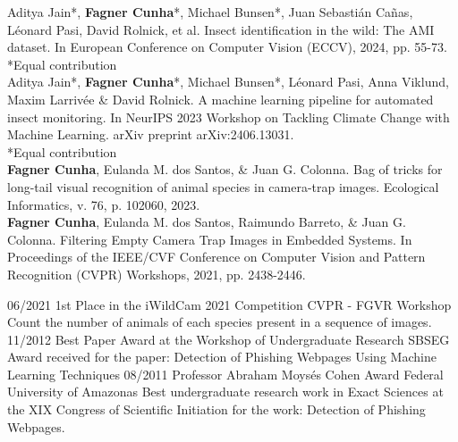 \documentclass[10pt]{developercv} %
\begin{document}
\begin{minipage}[t]{\textwidth}

Aditya Jain*, \textbf{Fagner Cunha}*, Michael Bunsen*, Juan Sebasti{\'a}n
Ca{\~n}as, L{\'e}onard Pasi, David Rolnick, et al. Insect identification in the
wild: The AMI dataset. In European Conference on Computer Vision (ECCV), 2024,
pp. 55-73.\\
{*\scriptsize Equal contribution}\\

Aditya Jain*, \textbf{Fagner Cunha}*, Michael Bunsen*, L{\'e}onard Pasi, Anna
Viklund, Maxim Larrivée \& David Rolnick. A machine learning pipeline for
automated insect monitoring. In NeurIPS 2023 Workshop on Tackling Climate
Change with Machine Learning. arXiv preprint arXiv:2406.13031.\\
{*\scriptsize Equal contribution}\\

\textbf{Fagner Cunha}, Eulanda M. dos Santos, \& Juan G.
Colonna. Bag of tricks for long-tail visual recognition of animal species in
camera-trap images.  Ecological Informatics, v. 76, p. 102060, 2023.\\

\textbf{Fagner Cunha}, Eulanda M. dos Santos, Raimundo Barreto, \& Juan G. 
Colonna. Filtering Empty Camera Trap Images in Embedded Systems. In Proceedings 
of the IEEE/CVF Conference on Computer Vision and Pattern 
Recognition (CVPR) Workshops, 2021, pp. 2438-2446.\\

\end{minipage}


\begin{entrylist}
  \entry
  {06/2021}
  {1st Place in the iWildCam 2021 Competition}
  {CVPR - FGVR Workshop}
  {Count the number of animals of each species present in a sequence of images.}
  \entry
  {11/2012}
  {Best Paper Award at the Workshop of Undergraduate Research}
  {SBSEG}
  {Award received for the paper: Detection
of Phishing Webpages Using Machine Learning Techniques}
  \entry
  {08/2011}
  {Professor Abraham Moysés Cohen Award}
  {Federal University of Amazonas}
  {Best undergraduate research work in Exact Sciences at the XIX Congress of
Scientific Initiation for the work: Detection of Phishing Webpages.}
\end{entrylist}
\end{document}
